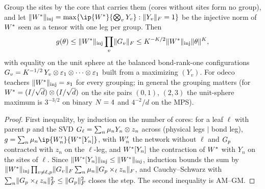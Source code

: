 \begin{proposition}\label{prop:A-gmax}
  \proven{} 
  Group the sites by the core that carries them (cores without sites form no group), and let
  $\norm{\Wt}_{\rm inj}=\max\{\ip{\Wt}{\bigotimes_vY_v}:\normF{Y_v}=1\}$ be the injective norm of $W^{*}$
  seen as a tensor with one leg per group. Then
  \begin{equation}\label{eq:A-gmax}
    g(\theta)\le\lVert W^{*}\rVert_{\rm inj}\prod_v\lVert G_{v}\rVert_{F}\le K^{-K/2}\lVert W^{*}\rVert_{\rm inj}\lVert\theta\rVert^{K},
  \end{equation}
  with equality on the unit sphere at the balanced bond-rank-one configurations
  $G_{v}=K^{-1/2}\,Y_v\otimes\varepsilon_1\otimes\dots\otimes\varepsilon_1$ built from a maximizing
  $(Y_v)$. For odeco teachers $\lVert W^{*}\rVert_{\rm inj}=s_{1}$ for every grouping; in general the grouping
  matters (for $W^{*}=(I/\sqrt d)\otimes(I/\sqrt d)$ on the site pairs $(0,1)$, $(2,3)$ the unit-sphere maximum
  is $3^{-3/2}$ on binary $N=4$ and $4^{-2}/d$ on the MPS).
\end{proposition}
\begin{proof}
  First inequality, by induction on the number of cores: for a leaf $\ell$ with parent $p$ and the SVD
  $G_{\ell}=\sum_n\mu_nY_n\otimes z_n$ across (physical legs $\mid$ bond leg),
  $g=\sum_n\mu_n\ip{\W'_n}{\Wt[Y_n]}$, with $W'_n$ the network without $\ell$ and $G_{p}$ contracted
  with $z_n$ on the $\ell$-leg, and $W^{*}[Y_n]$ the contraction of $W^{*}$ with $Y_n$ on the sites of $\ell$.
  Since $\lVert W^{*}[Y_n]\rVert_{\rm inj}\le\lVert W^{*}\rVert_{\rm inj}$, induction bounds the sum by
  $\lVert W^{*}\rVert_{\rm inj}\prod_{v\ne\ell,p}\lVert G_{v}\rVert_{F}\sum_n\mu_n\lVert G_{p}\times_\ell z_n\rVert_{F}$, and Cauchy--Schwarz with
  $\sum_n\lVert G_{p}\times_\ell z_n\rVert_{F}^2\le\lVert G_{p}\rVert_{F}^2$ closes the step. The second inequality is AM--GM.
\end{proof}

